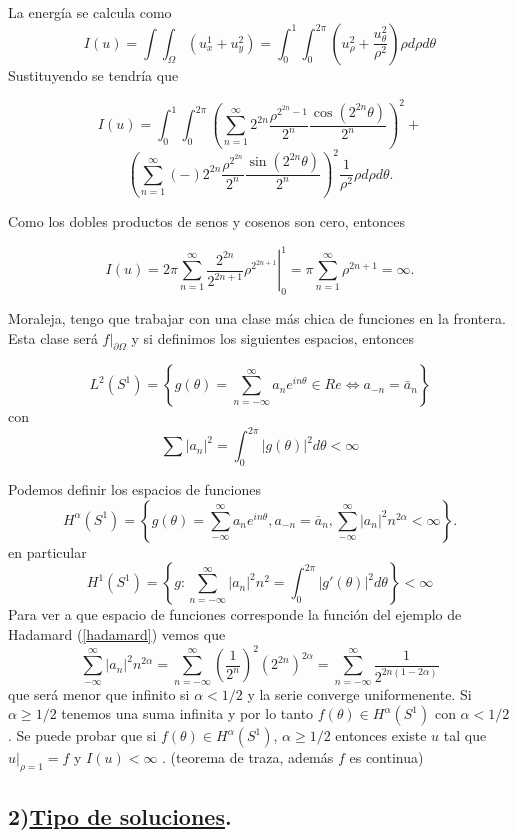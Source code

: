 \documentclass[a4paper,10pt]{book}
\begin{document}
La energ\'ia se calcula como
\[ I(u)= \int\int_{\Omega} (u_x^1+u_y^2)= \int_0^1 \int_0^{2\pi} \left( u_{\rho} ^{2} + \frac{u_\theta ^2 }{\rho^2} \right) \rho d\rho d\theta
\]
Sustituyendo se tendr\'ia que

\[ I(u)= \int_0^1 \int_0^{2\pi} \left( 
 \sum_{n=1}^{\infty}  2^{2n} \frac{\rho ^{2 ^{2n}-1 } }{2^n} \frac{\cos(2^{2n} \theta)}{2^n} \right)^2+
\]
\[
 \left( 
 \sum_{n=1}^{\infty} (-) 2^{2n} \frac{\rho ^{2 ^{2n} } }{2^n} \frac{\sin(2^{2n} \theta)}{2^n} \right)^2 \frac{1}{\rho^2} \rho 
d\rho d\theta.
\]

Como los dobles productos de senos y cosenos son cero, entonces

\[I(u)=\left.2\pi \sum_{n=1}^{\infty} \frac{2^{2n}}{2^{2n+1} } \rho^{2^{2n+1}}\right|_0^1=\pi \sum_{n=1}^{\infty} \rho^{2n+1}=\infty.\]

Moraleja, tengo que trabajar con una clase m\'as chica de funciones en la frontera. Esta clase ser\'a $f|_{\partial \Omega}$ y
si definimos los siguientes espacios, entonces

\[ L^2 (S^1)=\left\lbrace g(\theta)=\sum_{n=-\infty}^{\infty} a_n e^{i n \theta } \in Re \Leftrightarrow
 a_{-n}=\bar{a}_n \right\rbrace
\]
con 
\[\sum |a_n|^2 =\int_{0}^{2\pi} |g(\theta)|^2 d\theta < \infty \]

Podemos definir los espacios de funciones
\[H^{\alpha}(S^1)=\left\lbrace  g(\theta) = \sum_{-\infty}^{\infty} a_n e^{in\theta}, a_{-n}=\bar{a}_n, \sum_{-\infty}^{\infty} |a_n|^2 n^{2\alpha} <\infty  \right\rbrace.
\]
en particular
\[H^1(S^1)=\left\lbrace g: \sum_{n=-\infty}^{\infty} | a_n|^2 n^2 =\int_0^{2\pi} |g'(\theta)|^2 d\theta \right\rbrace < \infty \] 
Para ver a que espacio de funciones corresponde la funci\'on  del ejemplo de Hadamard (\ref{hadamard}) vemos que
\[\sum_{-\infty}^{\infty} |a_n|^2 n^{2\alpha} =\sum_{n=-\infty}^{\infty} \left(\frac{1}{2^n} \right)^2 (2^{2n} )^{2\alpha} =\sum_{n=-\infty}^{\infty} \frac{1}{2^{2n(1-2\alpha)}} \] 
que ser\'a menor que infinito si $\alpha <1/2$  y la serie converge uniformenente. Si $\alpha\geq 1/2$ tenemos una
suma infinita y por lo tanto $f(\theta)\in H^{\alpha}(S^{1} )$ con $\alpha<1/2$ .
Se puede probar que si $f(\theta)\in H^{\alpha}(S^1)$, $\alpha\geq 1/2$ entonces existe
$u$ tal que $u|_{\rho =1}=f$ y $I(u)<\infty$ . (teorema de traza, adem\'as $f$ es continua)

\subsection*{2)\underline{Tipo de soluciones}.}
\end{document}
